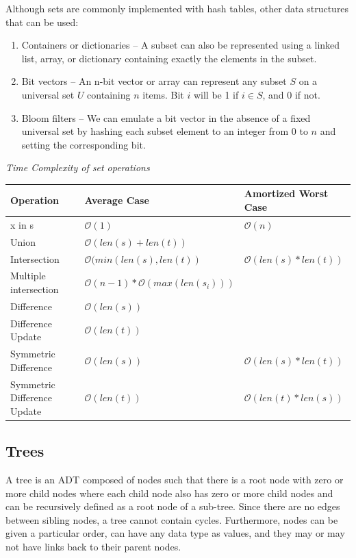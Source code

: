 \documentclass{article}
\newcommand{\bigO}{\mathcal{O}}
\begin{document}
    Although sets are commonly implemented with hash tables, other data structures that can be used:
    
    \begin{enumerate}
        \item Containers or dictionaries – A subset can also be represented using a linked list, array, or dictionary containing exactly the elements in the subset.
        \item Bit vectors – An n-bit vector or array can represent any subset $S$ on a universal set $U$ containing $n$ items. Bit $i$ will be 1 if $i \in S$, and $0$ if not.
        \item Bloom filters – We can emulate a bit vector in the absence of a fixed universal set by hashing each subset element to an integer from $0$ to $n$ and setting the corresponding bit.
    \end{enumerate}
    
    \vspace{8pt} \emph{Time Complexity of set operations}
    \begin{table}[H]
        \begin{tabular}{|l|l|l|}
            \hline
            \textbf{Operation} & \textbf{Average Case} & \textbf{Amortized Worst Case} \\
            \hline
            x in s & $\bigO(1)$ & $\bigO(n)$ \\
            Union & $\bigO(len(s)+len(t))$  & \\
            Intersection & $\bigO(min(len(s), len(t))$ & $\bigO(len(s) * len(t))$ \\
            Multiple intersection & $\bigO(n-1)*\bigO(max(len(s_i)))$ &\\
            Difference & $\bigO(len(s))$ & \\
            Difference Update & $\bigO(len(t))$ & \\
            Symmetric Difference & $\bigO(len(s))$ & $\bigO(len(s) * len(t))$ \\
            Symmetric Difference Update & $\bigO(len(t))$ & $\bigO(len(t) * len(s))$\\
            \hline
        \end{tabular}
    \end{table}


    
    \subsection{Trees}
    A tree is an ADT composed of nodes such that there is a root node with zero or more child nodes where each child node also has zero or more child nodes and can be recursively defined as a root node of a sub-tree. Since there are no edges between sibling nodes, a tree cannot contain cycles. Furthermore, nodes can be given a particular order, can have any data type as values, and they may or may not have links back to their parent nodes.
    
\end{document}
